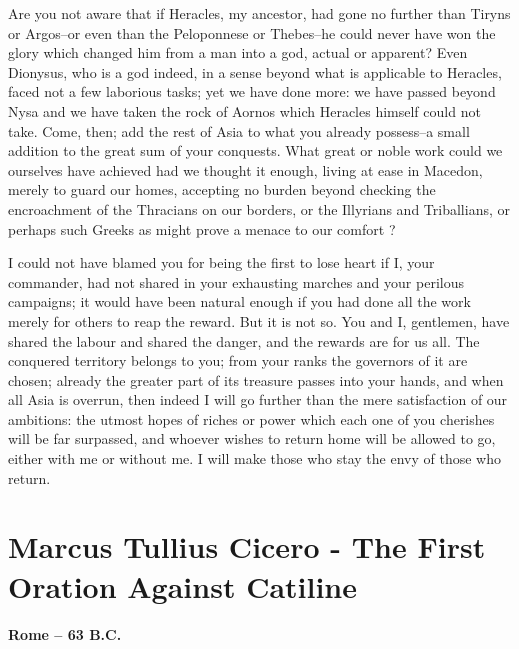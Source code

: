 \documentclass[a4paper]{amsbook}
\begin{document}
Are you not aware that if Heracles, my ancestor, had gone no further than Tiryns or Argos--or even than the Peloponnese or Thebes--he could never have won the glory which changed him from a man into a god, actual or apparent? Even Dionysus, who is a god indeed, in a sense beyond what is applicable to Heracles, faced not a few laborious tasks; yet we have done more: we have passed beyond Nysa and we have taken the rock of Aornos which Heracles himself could not take. Come, then; add the rest of Asia to what you already possess--a small addition to the great sum of your conquests. What great or noble work could we ourselves have achieved had we thought it enough, living at ease in Macedon, merely to guard our homes, accepting no burden beyond checking the encroachment of the Thracians on our borders, or the Illyrians and Triballians, or perhaps such Greeks as might prove a menace to our comfort ?

I could not have blamed you for being the first to lose heart if I, your commander, had not shared in your exhausting marches and your perilous campaigns; it would have been natural enough if you had done all the work merely for others to reap the reward. But it is not so. You and I, gentlemen, have shared the labour and shared the danger, and the rewards are for us all. The conquered territory belongs to you; from your ranks the governors of it are chosen; already the greater part of its treasure passes into your hands, and when all Asia is overrun, then indeed I will go further than the mere satisfaction of our ambitions: the utmost hopes of riches or power which each one of you cherishes will be far surpassed, and whoever wishes to return home will be allowed to go, either with me or without me. I will make those who stay the envy of those who return.


\chapter{Marcus Tullius Cicero - The First Oration Against Catiline}

\textbf{\Large{Rome -- 63 B.C.}}

\vspace{10 mm}
\end{document}
